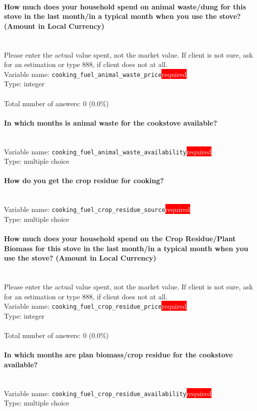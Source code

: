 \documentclass[11.5pt, a4paper]{scrartcl}
\begin{document}
\paragraph{How much  does your household spend on animal waste/dung for this stove in the last month/in a typical month when you use the stove? (Amount in Local Currency) }
\ \\ {\small Please enter the actual value spent, not the market value. If client is not sure, ask for an estimation or type 888, if client does not at all. }
\  \\Variable name: \texttt{cooking\_fuel\_animal\_waste\_price}\hfill\colorbox{red}{\small{\textcolor{white}{required}}}\\
 Type: integer\\
\\Total number of answers: 0 (0.0\%)
\\[0.2em]\paragraph{In which months is animal waste for the cookstove available?}
\  \\Variable name: \texttt{cooking\_fuel\_animal\_waste\_availability}\hfill\colorbox{red}{\small{\textcolor{white}{required}}}\\
 Type: multiple choice\\
\paragraph{How do you get the crop residue for cooking?}
\  \\Variable name: \texttt{cooking\_fuel\_crop\_residue\_source}\hfill\colorbox{red}{\small{\textcolor{white}{required}}}\\
 Type: multiple choice\\
\paragraph{How much  does your household spend on the Crop Residue/Plant Biomass for this stove in the last month/in a typical month when you use the stove? (Amount in Local Currency) }
\ \\ {\small Please enter the actual value spent, not the market value. If client is not sure, ask for an estimation or type 888, if client does not at all. }
\  \\Variable name: \texttt{cooking\_fuel\_crop\_residue\_price}\hfill\colorbox{red}{\small{\textcolor{white}{required}}}\\
 Type: integer\\
\\Total number of answers: 0 (0.0\%)
\\[0.2em]\paragraph{In which months are plan biomass/crop residue for the cookstove available?}
\  \\Variable name: \texttt{cooking\_fuel\_crop\_residue\_availability}\hfill\colorbox{red}{\small{\textcolor{white}{required}}}\\
 Type: multiple choice\\
\end{document}

